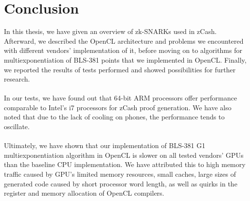 
\chapter{Conclusion} %

\label{Chapter9} %


In this thesis, we have given an overview of zk-SNARKs used in zCash. Afterward, we described the OpenCL architecture and problems we encountered with different vendors' implementation of it, before moving on to algorithms for multiexponentiation of BLS-381 points that we implemented in OpenCL. Finally, we reported the results of tests performed and showed possibilities for further research.\\
\\
In our tests, we have found out that 64-bit ARM processors offer performance comparable to Intel's i7 processors for zCash proof generation. We have also noted that due to the lack of cooling on phones, the performance tends to oscillate.\\
\\
Ultimately, we have shown that our implementation of BLS-381 G1 multiexponentiation algorithm in OpenCL is slower on all tested vendors' GPUs than the baseline CPU implementation. We have attributed this to high memory traffic caused by GPU's limited memory resources, small caches, large sizes of generated code caused by short processor word length, as well as quirks in the register and memory allocation of OpenCL compilers.